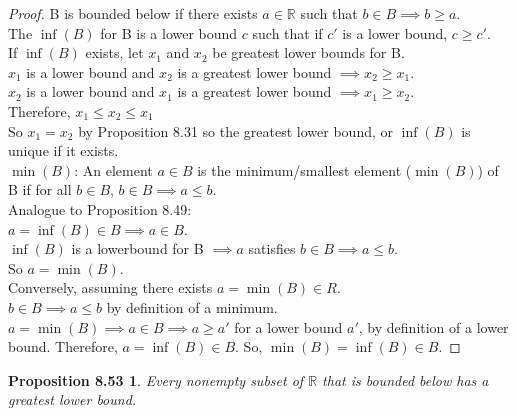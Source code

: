 \documentclass[12pt]{amsart}
\newcommand{\R}{\mathbb{R}}
\begin{document}
\begin{proof}
	B is bounded below if there exists $a \in \R$ such that $b\in B \implies b \ge a$. \\
	The $\inf(B)$ for B is a lower bound $c$ such that if $c'$ is a lower bound, $c \ge c'$. \\
	If $\inf(B)$ exists, let $x_1$ and $x_2$ be greatest lower bounds for B. \\
	$x_1$ is a lower bound and $x_2$ is a greatest lower bound $\implies x_2 \ge x_1$. \\
	$x_2$ is a lower bound and $x_1$ is a greatest lower bound $\implies x_1 \ge x_2$. \\
	Therefore, $x_1 \le x_2 \le x_1$ \\
	So $x_1 = x_2$ by Proposition 8.31 so the greatest lower bound, or $\inf(B)$ is unique if it exists. \\
	
	$\min(B)$: An element $a \in B$ is the minimum/smallest element ($\min(B)$) of B if for all $b\in B$, $b \in B \implies a \le b$. \\
	
	Analogue to Proposition 8.49: \\
	$a = \inf(B) \in B \implies a \in B$. \\
	$\inf(B)$ is a lowerbound for B $\implies a$ satisfies $b \in B \implies a \le b$. \\
	So $a = \min(B)$. \\
	
	Conversely, assuming there exists $a = \min(B) \in R$. \\
	$b\in B \implies a \le b$ by definition of a minimum. \\
	$a = \min(B) \implies a \in B \implies a \ge a'$ for a lower bound $a'$, by definition of a lower bound. Therefore, $a = \inf(B) \in B$. So, $\min(B) = \inf(B) \in B$.
\end{proof}

\newtheorem*{prop8.53}{Proposition 8.53}
\begin{prop8.53}
	Every nonempty subset of $\R$ that is bounded below has a greatest lower bound.
\end{prop8.53}
\end{document}
